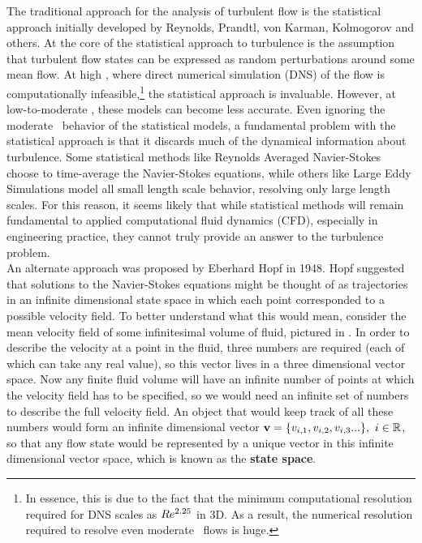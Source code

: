 The traditional approach for the analysis of turbulent flow is the statistical approach initially developed by Reynolds, Prandtl, von Karman, Kolmogorov and others. At the core of the statistical approach to turbulence is the assumption that turbulent flow states can be expressed as random perturbations around some mean flow. At high \ReN, where direct numerical simulation (DNS) of the flow is computationally infeasible,\footnote{In essence, this is due to the fact that the minimum computational resolution required for DNS scales as $Re^{2.25}$ in 3D. As a result, the numerical resolution required to resolve even moderate \ReN\ flows is huge.}  the statistical approach is invaluable. However, at low-to-moderate \ReN, these models can become less accurate. Even ignoring the moderate \ReN\ behavior of the statistical models, a fundamental problem with the statistical approach is that it discards much of the dynamical information about turbulence. Some statistical methods like Reynolds Averaged Navier-Stokes choose to time-average the Navier-Stokes equations, while others like Large Eddy Simulations model all small length scale behavior, resolving only large length scales. For this reason, it seems likely that while statistical methods will remain fundamental to applied computational fluid dynamics (CFD), especially in engineering practice, they cannot truly provide an answer to the turbulence problem. \\

An alternate approach was proposed by Eberhard Hopf in 1948. Hopf suggested that solutions to the Navier-Stokes equations might be thought of as trajectories in an infinite dimensional state space in which each point corresponded to a possible velocity field. To better understand what this would mean, consider the mean velocity field of some infinitesimal volume of fluid, pictured in . In order to describe the velocity at a point in the fluid, three numbers are required (each of which can take any real value), so this vector lives in a three dimensional vector space. Now any finite fluid volume will have an infinite number of points at which the velocity field has to be specified, so we would need an infinite set of numbers to describe the full velocity field. An object that would keep track of all these numbers would form an infinite dimensional vector $\mathbf{v} = \{v_{i,1},v_{i,2},v_{i,3}...\},~i \in \mathbb{R}$, so that any flow state would be represented by a unique vector in this infinite dimensional vector space, which is known as the {\bf state space}. 


